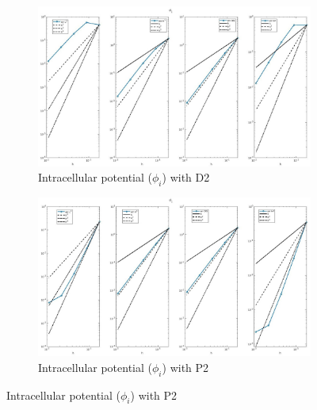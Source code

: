 \documentclass[a4paper,11pt]{article}
\begin{document}
\begin{figure}[H]
\caption{Comparison of the intracellular potential ($\phi_i$)}
\label{phii_2}
\begin{subfigure}{\textwidth}
\begin{center}
\includegraphics[width = \textwidth]{./D2_Phii_1.jpg}
\caption{Intracellular potential ($\phi_i$) with D2}
\end{center}
\end{subfigure}
\begin{subfigure}{\textwidth}
\begin{center}
\includegraphics[width =\textwidth]{./P2_Phii_1.jpg}
\caption{Intracellular potential ($\phi_i$) with P2}
\end{center}
\end{subfigure}
\end{figure}
\newpage
\end{document}
